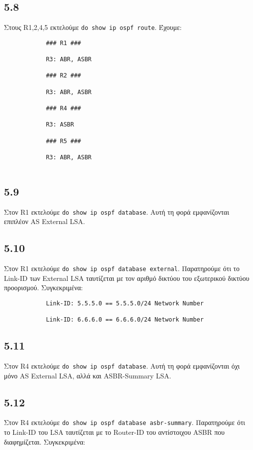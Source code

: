 \documentclass[a4paper, 12pt]{article}
\begin{document}
	\subsection*{5.8}
		Στους R1,2,4,5 εκτελούμε \verb|do show ip ospf route|. Έχουμε:
		
		\begin{verbatim}
			### R1 ###
			
			R3: ABR, ASBR
			
			### R2 ###
			
			R3: ABR, ASBR
			
			### R4 ### 
			
			R3: ASBR
			
			### R5 ###
			
			R3: ABR, ASBR
			
		\end{verbatim}

	\subsection*{5.9}
		Στον R1 εκτελούμε \verb|do show ip ospf database|. Αυτή τη φορά εμφανίζονται επιπλέον AS External LSA.

	\subsection*{5.10}
		Στον R1 εκτελούμε \verb|do show ip ospf database external|. Παρατηρούμε ότι το Link-ID των External LSA ταυτίζεται με τον αριθμό δικτύου του εξωτερικού δικτύου προορισμού. Συγκεκριμένα:
		
		\begin{verbatim}
			Link-ID: 5.5.5.0 == 5.5.5.0/24 Network Number
			
			Link-ID: 6.6.6.0 == 6.6.6.0/24 Network Number
		\end{verbatim}

	\subsection*{5.11}
		Στον R4 εκτελούμε \verb|do show ip ospf database|. Αυτή τη φορά εμφανίζονται όχι μόνο AS External LSA, αλλά και ASBR-Summary LSA.

	\subsection*{5.12}
		Στον R4 εκτελούμε \verb|do show ip ospf database asbr-summary|. Παρατηρούμε ότι το Link-ID του LSA ταυτίζεται με το Router-ID του αντίστοιχου ASBR που διαφημίζεται. Συγκεκριμένα:
		
\end{document}
